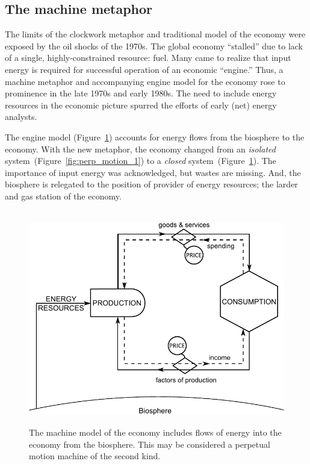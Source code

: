 \subsection{The machine metaphor}
\label{sec:machine_metaphor}

The limits of the clockwork metaphor and traditional model of the economy were 
exposed by the oil shocks of the 1970s.
The global economy
``stalled'' due to lack of 
a single, highly-constrained resource:
fuel.
Many came to realize that input energy is required
for successful operation of an economic ``engine.''
Thus, a machine metaphor and 
accompanying engine model for the economy 
rose to prominence
in the late 1970s and early 1980s.
The need to include energy resources
in the economic picture
spurred the efforts of early (net) energy 
analysts.\cite{Gilliland1975, Chapman1976}

The engine model (Figure~\ref{fig:perp_motion_2}) 
accounts for energy flows from the biosphere 
to the economy.
With the new metaphor, the economy changed from 
an \emph{isolated} system~(Figure~\ref{fig:perp_motion_1}) to 
a \emph{closed} system~(Figure~\ref{fig:perp_motion_2}). 
The importance of input energy was acknowledged, 
but wastes are missing.
And, the biosphere is relegated to the position
of provider of energy resources;
the larder and gas station of the economy.\cite{Norgaard2010}

\begin{figure}[H]
\centering\
\includegraphics[width=\linewidth]{Part_0/Chapter_Introduction/images/Perpetual_motion_2.pdf}
\caption[The machine model]{The machine model of the economy includes
flows of energy into the economy from the biosphere.
This may be considered a perpetual motion machine 
of the second kind.}
\label{fig:perp_motion_2}
\end{figure}

